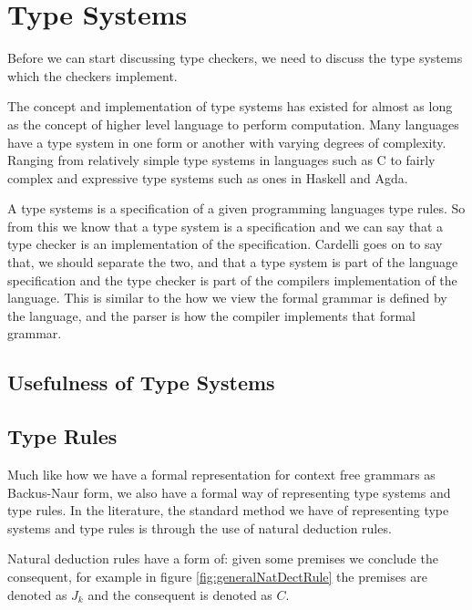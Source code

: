 \section{Type Systems}
Before we can start discussing type checkers, we need to discuss the type systems which the checkers implement.

The concept and implementation of type systems has existed for almost as long as the concept of higher level language to perform computation\cite{Backus:1978:HFI:960118.808380}.
Many languages have a type system in one form or another with varying degrees of complexity.
Ranging from relatively simple type systems in languages such as C to fairly complex and expressive type systems such as ones in Haskell and Agda.

A type systems is a specification of a given programming languages type rules\cite{cardelli1996type}.
So from this we know that a type system is a specification and we can say that a type checker is an implementation of the specification.
Cardelli goes on to say that, we should separate the two, and that a type system is part of the language specification and the type checker is part of the compilers implementation of the language\cite{cardelli1996type}.
This is similar to the how we view the formal grammar is defined by the language, and the parser is how the compiler implements that formal grammar\cite{cardelli1996type}.

\subsection{Usefulness of Type Systems}


\subsection{Type Rules}

Much like how we have a formal representation for context free grammars as Backus-Naur form\cite{Backus1960,aho2003compilers,ranta2012implementing}, we also have a formal way of representing type systems and type rules.
In the literature, the standard method we have of representing type systems and type rules is through the use of natural deduction rules\cite{cardelli1996type,ranta2012implementing}.

Natural deduction rules have a form of: given some premises we conclude the consequent\cite{prawitz2006natural,ranta2012implementing}, for example in figure \ref{fig:generalNatDectRule} the premises are denoted as $J_k$ and the consequent is denoted as $C$.

